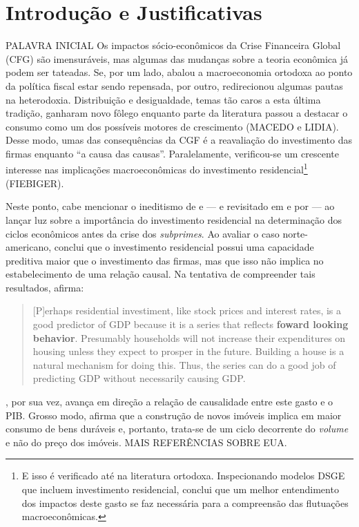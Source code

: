 \section{Introdução e Justificativas}\label{Intro}



PALAVRA INICIAL 
Os impactos sócio-econômicos da Crise Financeira Global (CFG) são imensuráveis, mas algumas das mudanças sobre a teoria econômica já podem ser tateadas. Se, por um lado, abalou a macroeconomia ortodoxa ao ponto da política fiscal estar sendo repensada, por outro, redirecionou algumas pautas na heterodoxia. Distribuição e desigualdade, temas tão caros a esta última tradição, ganharam novo fôlego enquanto parte da literatura passou a destacar o consumo como um dos possíveis motores de crescimento (MACEDO e LIDIA). Desse modo, umas das consequências da CGF é a reavaliação do investimento das firmas enquanto  ``a causa das causas''. Paralelamente, verificou-se um crescente interesse nas implicações macroeconômicas do investimento residencial\footnote{E isso é verificado até na literatura ortodoxa. Inspecionando modelos DSGE que incluem investimento residencial, \textcite{iacoviello_housing_2010} conclui que um melhor entendimento dos impactos deste gasto se faz necessária para a compreensão das flutuações macroeconômicas. } (FIEBIGER). 

Neste ponto, cabe mencionar o ineditismo de \textcite{green_follow_1997} e \textcite{leamer_housing_2007} --- e revisitado em \textcite{leamer_housing_2015} e por \textcite{fiebiger_trend_2017} --- ao lançar luz sobre a importância do investimento residencial na determinação dos ciclos econômicos antes da crise dos \textit{subprimes}. Ao avaliar o caso norte-americano, \textcite{green_follow_1997} conclui que o investimento residencial possui uma capacidade preditiva maior que o investimento das firmas, mas que isso não implica no estabelecimento de uma relação causal. Na tentativa de compreender tais resultados, afirma:

\begin{quote}
	
	[P]erhaps residential investiment, like stock prices and interest rates, is a good predictor of GDP because it is a series that reflects \textbf{foward looking behavior}. Presumably households will not increase their expenditures on housing unless they expect to prosper in the future. Building a house is a natural mechanism for doing this. Thus, the series can do a good job of predicting GDP without necessarily causing GDP.
	\cite[p.~267, grifos adicionados]{green_follow_1997}
\end{quote}
\textcite{leamer_housing_2007}, por sua vez, avança em direção a relação de causalidade entre este gasto e o PIB. Grosso modo, afirma que a construção de novos imóveis implica em maior consumo de bens duráveis e, portanto, trata-se de um ciclo decorrente do \textit{volume} e não do preço dos imóveis. MAIS REFERÊNCIAS SOBRE EUA.


